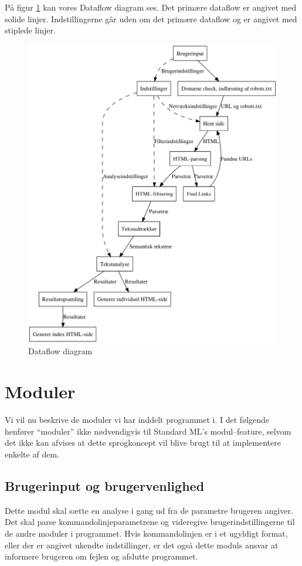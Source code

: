 \documentclass[a4paper,oneside,article]{memoir}
\begin{document}
På figur \ref{dataflowdia} kan vores Dataflow diagram ses. Det primære
dataflow er angivet med solide linjer. Indstillingerne går uden om det
primære dataflow og er angivet med stiplede linjer.
\begin{figure}
  \includegraphics[width=\textwidth]{endeligtdesignill.pdf}
  \caption{Dataflow diagram}
  \label{dataflowdia}
\end{figure}

\newpage
\section{Moduler}
Vi vil nu beskrive de moduler vi har inddelt programmet i. I det
følgende henfører ``moduler'' ikke nødvendigvis til Standard ML's
modul--feature, selvom det ikke kan afvises at dette sprogkoncept vil
blive brugt til at implementere enkelte af dem.

\subsection{Brugerinput og brugervenlighed}
Dette modul skal sætte en analyse i gang ud fra de parametre brugeren
angiver. Det skal parse kommandolinjeparametrene og videregive
brugerindstillingerne til de andre moduler i programmet. Hvis
kommandolinjen er i et ugyldigt format, eller der er angivet ukendte
indstillinger, er det også dette moduls ansvar at informere brugeren
om fejlen og afslutte programmet.
\end{document}
